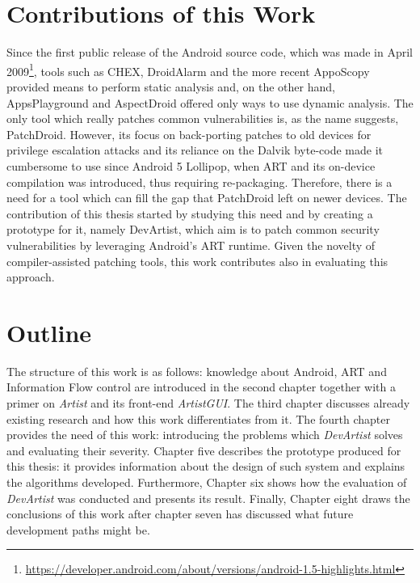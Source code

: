 \section{Contributions of this Work} 
Since the first public release of the Android source code, which was made in April 2009\footnote{\url{https://developer.android.com/about/versions/android-1.5-highlights.html}}, tools such as CHEX\cite{chex}, DroidAlarm\cite{droidalarm} and the more recent AppoScopy\cite{apposcopy} provided means to perform static analysis and, on the other hand, AppsPlayground\cite{appsplayground} and AspectDroid\cite{AspectDroid} offered only ways to use dynamic analysis. The only tool which really patches common vulnerabilities is, as the name suggests, PatchDroid\cite{patchdroid}. However, its focus on back-porting patches to old devices for privilege escalation attacks and its reliance on the Dalvik byte-code made it cumbersome to use since Android 5 Lollipop, when ART and its on-device compilation was introduced, thus requiring re-packaging. Therefore, there is a need for a tool which can fill the gap that PatchDroid left on newer devices. The contribution of this thesis started by studying this need and by creating a prototype for it, namely DevArtist, which aim is to patch common security vulnerabilities by leveraging Android's ART runtime. Given the novelty of compiler-assisted patching tools, this work contributes also in evaluating this approach.

\section{Outline}
The structure of this work is as follows: knowledge about Android, ART and Information Flow control are introduced in the second chapter together with a primer on \emph{Artist} and its front-end \emph{ArtistGUI}. The third chapter discusses already existing research and how this work differentiates from it. The fourth chapter provides the need of this work: introducing the problems which \emph{DevArtist} solves and evaluating their severity. Chapter five describes the prototype produced for this thesis: it provides information about the design of such system and explains the algorithms developed. Furthermore, Chapter six shows how the evaluation of \emph{DevArtist} was conducted and presents its result. 
Finally, Chapter eight draws the conclusions of this work after chapter seven has discussed what future development paths might be.

